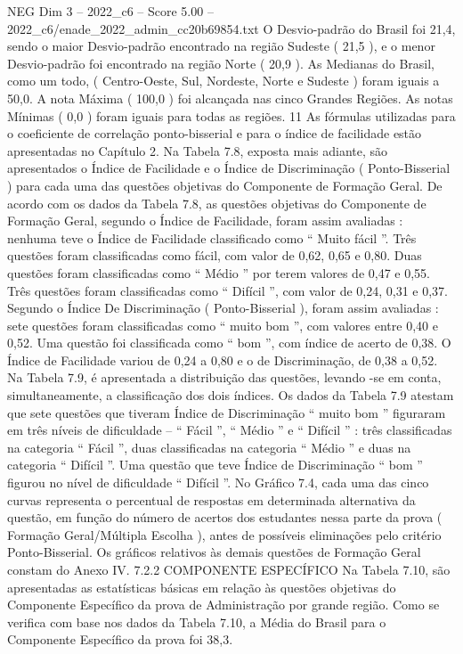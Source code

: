 \begin{textsample}{NEG Dim 3 – 2022\_c6 – Score 5.00 – 2022\_c6/enade\_2022\_admin\_cc20b69854.txt}
O Desvio-padrão do Brasil foi 21,4, sendo o maior Desvio-padrão encontrado na região Sudeste ( 21,5 ), e o menor Desvio-padrão foi encontrado na região Norte ( 20,9 ).
As Medianas do Brasil, como um todo, ( Centro-Oeste, Sul, Nordeste, Norte e Sudeste ) foram iguais a 50,0.
A nota Máxima ( 100,0 ) foi alcançada nas cinco Grandes Regiões.
As notas Mínimas ( 0,0 ) foram iguais para todas as regiões. 11 As fórmulas utilizadas para o coeficiente de correlação ponto-bisserial e para o índice de facilidade estão apresentadas no Capítulo 2.
Na Tabela 7.8, exposta mais adiante, são apresentados o Índice de Facilidade e o Índice de Discriminação ( Ponto-Bisserial ) para cada uma das questões objetivas do Componente de Formação Geral.
De acordo com os dados da Tabela 7.8, as questões objetivas do Componente de Formação Geral, segundo o Índice de Facilidade, foram assim avaliadas : nenhuma teve o Índice de Facilidade classificado como “ Muito fácil ”.
Três questões foram classificadas como fácil, com valor de 0,62, 0,65 e 0,80.
Duas questões foram classificadas como “ Médio ” por terem valores de 0,47 e 0,55.
Três questões foram classificadas como “ Difícil ”, com valor de 0,24, 0,31 e 0,37.
Segundo o Índice De Discriminação ( Ponto-Bisserial ), foram assim avaliadas : sete questões foram classificadas como “ muito bom ”, com valores entre 0,40 e 0,52.
Uma questão foi classificada como “ bom ”, com índice de acerto de 0,38.
O Índice de Facilidade variou de 0,24 a 0,80 e o de Discriminação, de 0,38 a 0,52.
Na Tabela 7.9, é apresentada a distribuição das questões, levando -se em conta, simultaneamente, a classificação dos dois índices.
Os dados da Tabela 7.9 atestam que sete questões que tiveram Índice de Discriminação “ muito bom ” figuraram em três níveis de dificuldade – “ Fácil ”, “ Médio ” e “ Difícil ” : três classificadas na categoria “ Fácil ”, duas classificadas na categoria “ Médio ” e duas na categoria “ Difícil ”.
Uma questão que teve Índice de Discriminação “ bom ” figurou no nível de dificuldade “ Difícil ”.
No Gráfico 7.4, cada uma das cinco curvas representa o percentual de respostas em determinada alternativa da questão, em função do número de acertos dos estudantes nessa parte da prova ( Formação Geral/Múltipla Escolha ), antes de possíveis eliminações pelo critério Ponto-Bisserial.
Os gráficos relativos às demais questões de Formação Geral constam do Anexo IV. 7.2.2 COMPONENTE ESPECÍFICO Na Tabela 7.10, são apresentadas as estatísticas básicas em relação às questões objetivas do Componente Específico da prova de Administração por grande região.
Como se verifica com base nos dados da Tabela 7.10, a Média do Brasil para o Componente Específico da prova foi 38,3.

\end{textsample}
